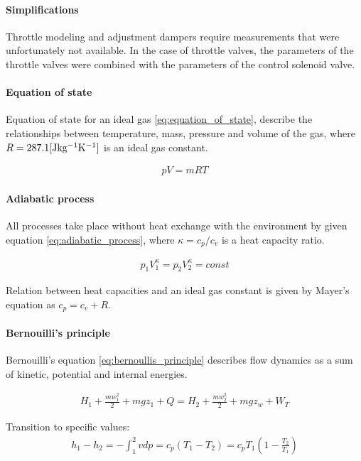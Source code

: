 \paragraph{Simplifications}
Throttle modeling and adjustment dampers require measurements that were
unfortunately not available. In the case of throttle valves, the parameters
of the throttle valves were combined with the parameters of the control
solenoid valve.


\paragraph{Equation of state}
Equation of state for an ideal gas \ref{eq:equation_of_state}, describe the relationships between
temperature, mass, pressure and volume of the gas, where $R=287.1 \rm [Jkg^{-1}K^{-1}]$ is an ideal gas
constant.

\begin{align}
    pV = mRT
    \label{eq:equation_of_state}
\end{align} 

\paragraph{Adiabatic process}
All processes take place without heat exchange with the environment by
given equation \ref{eq:adiabatic_process}, where $\kappa = c_p/c_v$ is a
heat capacity ratio.

\begin{align}
     p_1V_1^{\kappa} =  p_2V_2^{\kappa} = const
    \label{eq:adiabatic_process}
\end{align}

Relation between heat capacities and an ideal gas constant is given
by Mayer's equation as $c_p = c_v + R$.



\paragraph{Bernouilli's principle}
Bernouilli's equation \ref{eq:bernoullis_principle} describes flow
dynamics as a sum of kinetic, potential and internal energies.

\begin{align}
    H_1 + \frac{mw_1^2}{2} + mgz_1 + Q = H_2 + \frac{mw_2^2}{2} + mgz_w +
    W_T
    \label{eq:bernoullis_principle}
\end{align}

Transition to specific values:
\begin{align}
    h_1- h_2 = -\int_1^2 v dp = c_p(T_1-T_2) = 
    c_p T_1\left(1-\frac{T_2}{T_1}\right)
    \label{eq:etalpi_sub}
\end{align}

